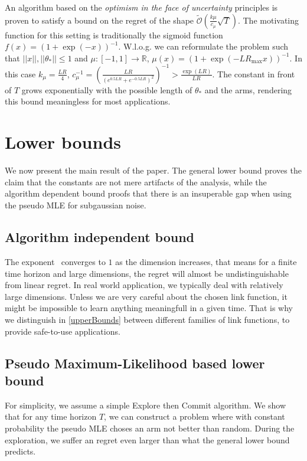 \documentclass[twoside]{article} \usepackage{aistats2017}
\begin{document}
An algorithm based on the \textit{optimism in the face of uncertainty} principles is proven to satisfy a bound on the regret of the shape $\tilde{\mathcal{O}}(\frac{k\mu}{c_\mu}\sqrt{T})$. 
The motivating function for this setting is traditionally the sigmoid function $f(x) = (1+\exp(-x))^{-1}$.
W.l.o.g. we can reformulate the problem such that $||x||,||\theta_*||\leq 1$ and $\mu:[-1,1]\rightarrow\mathbb{R}$,
$\mu(x) = (1+\exp(-LR_{\max}x))^{-1}$.
In this case $k_\mu = \frac{LR}{4}$, $c_\mu^{-1} = \left(\frac{LR}{(e^{0.5LR}+e^{-0.5LR})^2}\right)^{-1} > \frac{\exp(LR)}{LR}$. The constant in front of $T$ grows exponentially with the possible length of $\theta_*$ and the arms, rendering this bound meaningless for most applications.


\section{Lower bounds} \label{lowerBounds}

We now present the main result of the paper. The general lower bound proves the claim that the constants are not mere artifacts of the analysis, while the algorithm dependent bound proofs that there is an insuperable gap when using the pseudo MLE for subgaussian noise.

\subsection{Algorithm independent bound}

The exponent $\frac{}{}$ converges to $1$ as the dimension increases, that means for a finite time horizon and large dimensions, the regret will almost be undistinguishable from linear regret. 
In real world application, we typically deal with relatively large dimensions. 
Unless we are very careful about the chosen link function, it might be impossible to learn anything meaningfull in a given time.
That is why we distinguish in \ref{upperBounds} between different families of link functions, to provide safe-to-use applications.

\subsection{Pseudo Maximum-Likelihood based lower bound}
For simplicity, we assume a simple Explore then Commit algorithm. 
We show that for any time horizon $T$, we can construct a problem where with constant probability the pseudo MLE choses an arm not better than random.
During the exploration, we suffer an regret even larger than what the general lower bound predicts.
\end{document}
